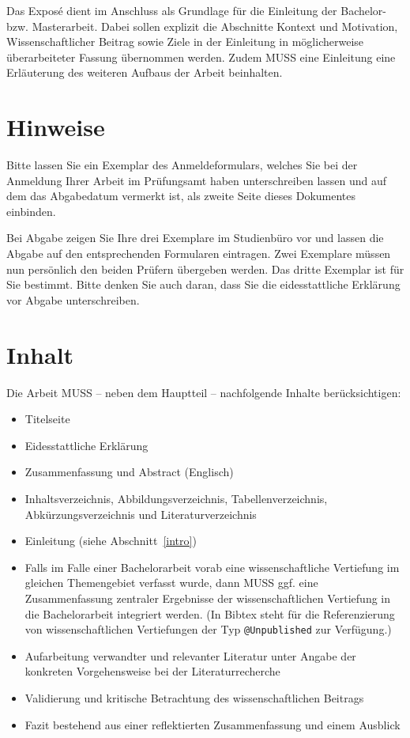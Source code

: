 Das Expos\'{e} dient im Anschluss als Grundlage für die Einleitung der Bachelor- bzw. Masterarbeit.
Dabei sollen explizit die Abschnitte Kontext und Motivation, Wissenschaftlicher Beitrag sowie
Ziele in der Einleitung in möglicherweise überarbeiteter Fassung übernommen werden. Zudem MUSS
eine Einleitung eine Erläuterung des weiteren Aufbaus der Arbeit beinhalten.

\section{Hinweise}

Bitte lassen Sie ein Exemplar des Anmeldeformulars, welches Sie bei der Anmeldung Ihrer Arbeit
im Prüfungsamt haben unterschreiben lassen und auf dem das Abgabedatum vermerkt ist, als zweite
Seite dieses Dokumentes einbinden.

Bei Abgabe zeigen Sie Ihre drei Exemplare im Studienbüro vor und lassen die Abgabe auf den
entsprechenden Formularen eintragen. Zwei Exemplare müssen nun persönlich den beiden Prüfern
übergeben werden. Das dritte Exemplar ist für Sie bestimmt.
Bitte denken Sie auch daran, dass Sie die eidesstattliche Erklärung vor Abgabe unterschreiben.

\section{Inhalt}

Die Arbeit MUSS -- neben dem Hauptteil -- nachfolgende Inhalte berücksichtigen:

\begin{itemize}
  \item Titelseite
  \item Eidesstattliche Erklärung
  \item Zusammenfassung und Abstract (Englisch)
  \item Inhaltsverzeichnis, Abbildungsverzeichnis, Tabellenverzeichnis, Abkürzungs\-ver\-zeichnis und Literaturverzeichnis
  \item Einleitung (siehe Abschnitt~\ref{intro})
  \item Falls im Falle einer Bachelorarbeit vorab eine wissenschaftliche Vertiefung im gleichen Themengebiet
  verfasst wurde, dann MUSS ggf. eine Zusammenfassung zentraler Ergebnisse der wissenschaftlichen Vertiefung
  in die Bachelorarbeit integriert werden. (In Bibtex steht für die Referenzierung von wissenschaftlichen
  Vertiefungen der Typ \verb|@Unpublished| zur Verfügung.)
  \item Aufarbeitung verwandter und relevanter Literatur unter Angabe der konkreten
  Vorgehensweise bei der Literaturrecherche
  \item Validierung und kritische Betrachtung des wissenschaftlichen Beitrags
  \item Fazit bestehend aus einer reflektierten Zusammenfassung und einem Ausblick
\end{itemize}


